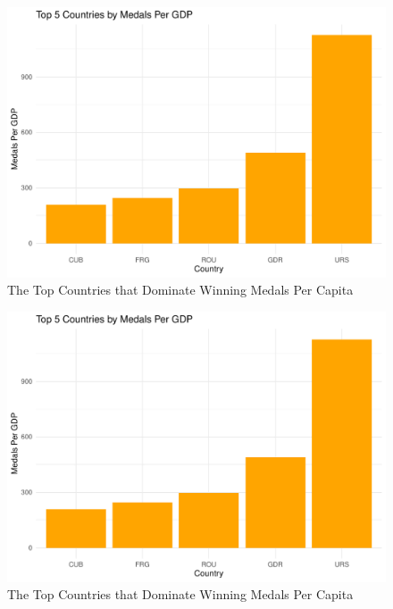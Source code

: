 \documentclass[
  12pt,
]{elsarticle}
\begin{document}
\begin{figure}

{\centering \includegraphics{README_files/figure-latex/unnamed-chunk-3-1} 

}

\caption{The Top Countries that Dominate Winning Medals Per Capita\label{Figure3}}\label{fig:unnamed-chunk-3-1}
\end{figure}
\begin{figure}

{\centering \includegraphics{README_files/figure-latex/unnamed-chunk-3-2} 

}

\caption{The Top Countries that Dominate Winning Medals Per Capita\label{Figure3}}\label{fig:unnamed-chunk-3-2}
\end{figure}
\end{document}
